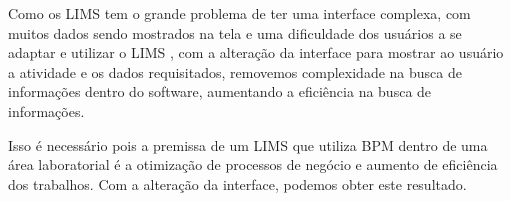 
Como os LIMS tem o grande problema de ter uma interface complexa, com muitos dados sendo mostrados na tela e uma dificuldade dos usuários a se adaptar e utilizar o LIMS \R, com a alteração da interface para mostrar ao usuário a atividade e os dados requisitados, removemos complexidade na busca de informações dentro do software, aumentando a eficiência na busca de informações.


Isso é necessário pois a premissa de um LIMS que utiliza BPM dentro de uma área laboratorial é a otimização de processos de negócio e aumento de eficiência dos trabalhos. Com a alteração da interface, podemos obter este resultado.
